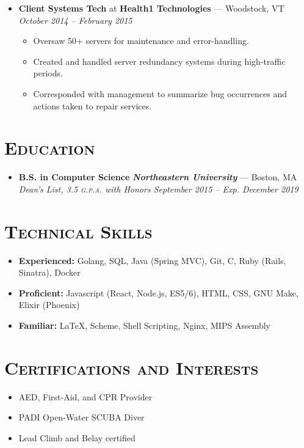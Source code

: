 \documentclass{article}
\begin{document}
\begin{itemize}[label={},leftmargin=*]
\item \textbf{Client Systems Tech} at \textbf{Health1 Technologies} --- Woodstock, VT \hfill {\em October 2014 -- February 2015}
  \begin{itemize}[label={$\bullet$}]
  \item Oversaw 50+ servers for maintenance and error-handling.
  \item Created and handled server redundancy systems during high-traffic periods.
  \item Corresponded with management to summarize bug occurrences and actions taken to repair services.
  \end{itemize}

\end{itemize}

\section*{\textsc{Education}}
\begin{itemize}[label={},leftmargin=*]
\item \textbf{B.S. in Computer Science} \hfill \textit{\textbf{Northeastern University}} --- Boston, MA \\ \em{Dean's List}, 3.5 \textsc{g.p.a.} with Honors \hfill {\em \textit{September 2015 -- Exp. December 2019}}
\end{itemize}

\section*{\textsc{Technical Skills}}
\begin{itemize}[label={},leftmargin=*]
\item \textbf{Experienced:} Golang, SQL, Java (Spring MVC), Git, C, Ruby (Rails, Sinatra), Docker
\item \textbf{Proficient:} Javascript (React, Node.js, ES5/6), HTML, CSS, GNU Make, Elixir (Phoenix)
\item \textbf{Familiar:} LaTeX, Scheme, Shell Scripting, Nginx, MIPS Assembly
\end{itemize}


\section*{\textsc{Certifications and Interests}}
\begin{multicols}{2}
  \begin{itemize}[label={$\bullet$}]
  \item AED, First-Aid, and CPR Provider
  \item PADI Open-Water SCUBA Diver
  \item Lead Climb and Belay certified
  \end{itemize}
\end{multicols}
\end{document}
